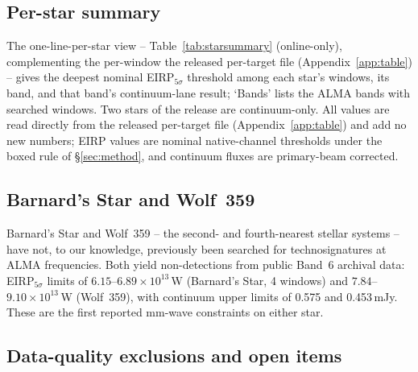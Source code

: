 \documentclass{openjournal}
\begin{document}
\subsection{Per-star summary}
\label{sec:starsummary}

The one-line-per-star view -- Table~\ref{tab:starsummary}
(online-only), complementing the per-window the released per-target file (Appendix~\ref{app:table}) --
gives the deepest nominal EIRP$_{5\sigma}$ threshold among each star's
windows, its band, and that band's continuum-lane result; `Bands'
lists the ALMA bands with searched windows. Two stars of the release
are continuum-only. All values are read directly from
the released per-target file (Appendix~\ref{app:table}) and add no new numbers; EIRP values are nominal
native-channel thresholds under the boxed rule of \S\ref{sec:method},
and continuum fluxes are primary-beam corrected.


\subsection{Barnard's Star and Wolf~359}
\label{sec:barnardswolf}

Barnard's Star and Wolf~359 -- the second- and fourth-nearest stellar
systems -- have not, to our knowledge, previously been searched for
technosignatures at ALMA frequencies. Both yield non-detections from
public Band~6 archival data: EIRP$_{5\sigma}$ limits of
$6.15$--$6.89\times10^{13}$\,W (Barnard's Star, 4 windows) and
$7.84$--$9.10\times10^{13}$\,W (Wolf~359), with continuum upper limits
of 0.575 and 0.453\,mJy. These are the first reported mm-wave
constraints on either star.

\subsection{Data-quality exclusions and open items}
\label{sec:exclusions}
\end{document}
